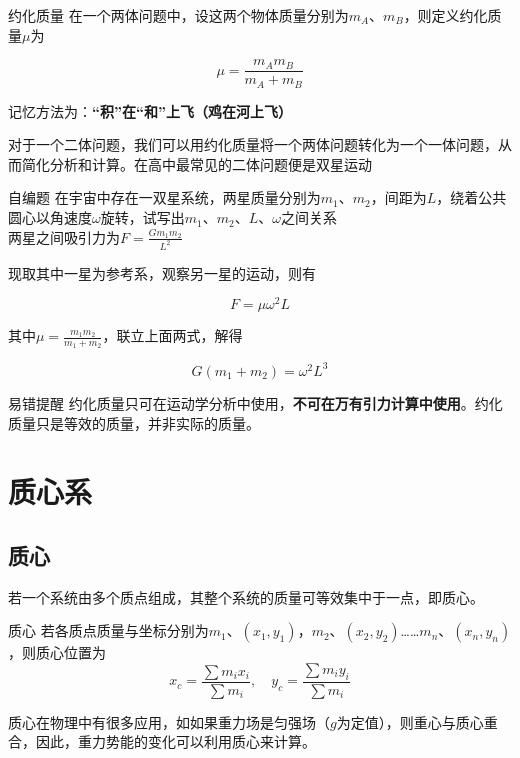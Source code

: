 \begin{defi}{约化质量}{}
在一个两体问题中，设这两个物体质量分别为$m_A$、$m_B$，则定义约化质量$\mu$为

$$\mu = \frac{m_A m_B}{m_A + m_B}$$

记忆方法为：\textbf{“积”在“和”上飞（鸡在河上飞）}
\end{defi}

对于一个二体问题，我们可以用约化质量将一个两体问题转化为一个一体问题，从而简化分析和计算。在高中最常见的二体问题便是双星运动

\begin{ep}{自编题}{}
在宇宙中存在一双星系统，两星质量分别为$m_1$、$m_2$，间距为$L$，绕着公共圆心以角速度$\omega$旋转，试写出$m_1$、$m_2$、$L$、$\omega$之间关系
~\\

两星之间吸引力为$F = \frac{G m_1 m_2}{L^2}$

现取其中一星为参考系，观察另一星的运动，则有

$$F = \mu \omega^2 L$$

其中$\mu = \frac{m_1 m_2}{m_1 + m_2}$，联立上面两式，解得

\begin{equation}
\boxed{G (m_1 + m_2) = \omega^2 L^3}
\end{equation}

\end{ep}

\begin{mk}{易错提醒}{}
约化质量只可在运动学分析中使用，\textbf{不可在万有引力计算中使用}。约化质量只是等效的质量，并非实际的质量。
\end{mk}
\section{质心系}

\subsection{质心}

若一个系统由多个质点组成，其整个系统的质量可等效集中于一点，即质心。

\begin{defi}[label=zxdy]{质心}{}
若各质点质量与坐标分别为$m_1$、$(x_1,y_1)$，$m_2$、$(x_2,y_2)$……$m_n$、$(x_n,y_n)$，则质心位置为
$$x_c = \frac{\sum m_i x_i}{\sum m_i} ,\quad y_c = \frac{\sum m_i y_i}{\sum m_i}$$
\end{defi}

质心在物理中有很多应用，如如果重力场是匀强场（$g$为定值），则重心与质心重合，因此，重力势能的变化可以利用质心来计算。

